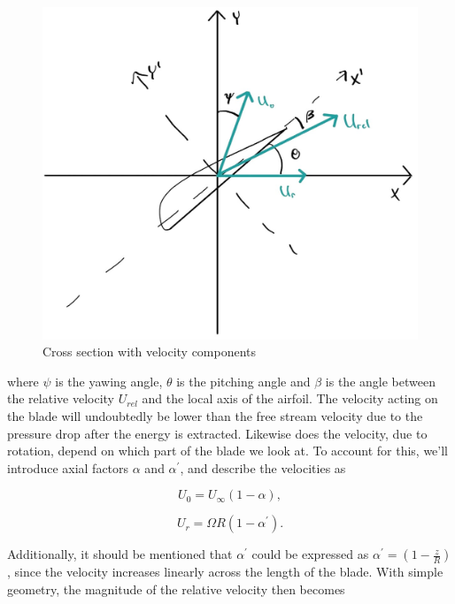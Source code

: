 \begin{figure}[H]
    \centering
    \includegraphics[scale=0.28]{Illustrations/BEMillustation1.jpg}
    \caption{Cross section with velocity components}
    \label{fig:winddirections}
\end{figure}

where $\psi$ is the yawing angle, $\theta$ is the pitching angle and $\beta$ is the angle between the relative velocity $U_{rel}$ and the local axis of the airfoil. The velocity acting on the blade will undoubtedly be lower than the free stream velocity due to the pressure drop after the energy is extracted. Likewise does the velocity, due to rotation, depend on which part of the blade we look at. To account for this, we'll introduce axial factors $\alpha$ and $\alpha^\prime$, and describe the velocities as

\begin{equation}
    U_0 = U_\infty (1-\alpha),
\end{equation}

\begin{equation}
    U_r = \Omega R (1-\alpha^\prime).
\end{equation}

Additionally, it should be mentioned that $\alpha^\prime$ could be expressed as $\alpha^\prime=\left( 1-\frac{z}{R} \right)$, since the velocity increases linearly across the length of the blade. With simple geometry, the magnitude of the relative velocity then becomes

